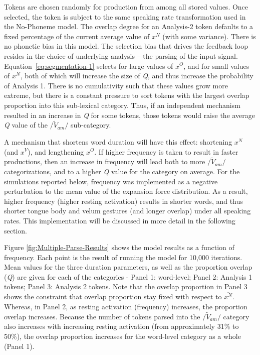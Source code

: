 Tokens are chosen randomly for production from among all stored values.
Once selected, the token is subject to the same speaking rate transformation
used in the No-Phoneme model. The overlap degree for an Analysis-2
token defaults to a fixed percentage of the current average value
of $x^{N}$ (with some variance). There is no phonetic bias in this
model. The selection bias that drives the feedback loop resides in
the choice of underlying analysis – the parsing of the input signal.
Equation~\ref{eq:segmentation-1} selects for large values of $x^{O}$,
and for small values of $x^{N}$, both of which will increase the
size of \emph{Q}, and thus increase the probability of Analysis 1.
There is no cumulativity such that these values grow more extreme,
but there is a constant pressure to sort tokens with the largest overlap
proportion into this sub-lexical category. Thus, if an independent
mechanism resulted in an increase in \emph{Q} for some tokens, those
tokens would raise the average \emph{Q} value of the $/\tilde{V}_{am}/$
sub-category.

A mechanism that shortens word duration will have this effect: shortening
$x^{N}$ (and $x^{V}$), and lengthening $x^{O}$. If higher frequency
is taken to result in faster productions, then an increase in frequency
will lead both to more $/\tilde{V}_{am}/$ categorizations, and to a higher \emph{Q} value for the category on average. For the simulations
reported below, frequency was implemented as a negative perturbation
to the mean value of the expansion force distribution. As a result,
higher frequency (higher resting activation) results in shorter words,
and thus shorter tongue body and velum gestures (and longer overlap)
under all speaking rates. This implementation will be discussed in
more detail in the following section. 

Figure \ref{fig:Multiple-Parse-Results} shows the model results as
a function of frequency. Each point is the result of running the model
for 10,000 iterations. Mean values for the three duration parameters,
as well as the proportion overlap (\emph{Q}) are given for each of
the categories - Panel 1: word-level; Panel 2: Analysis 1 tokens; Panel
3: Analysis 2 tokens. Note that the overlap proportion in Panel 3
shows the constraint that overlap proportion stay fixed with respect
to $\overline{x^{N}}$. Whereas, in Panel 2, as resting activation
(frequency) increases, the proportion overlap increases. Because the
number of tokens parsed into the $/\tilde{V}_{am}/$ category also
increases with increasing resting activation (from approximately 31\%
to 50\%), the overlap proportion increases for the word-level category
as a whole (Panel 1). 

